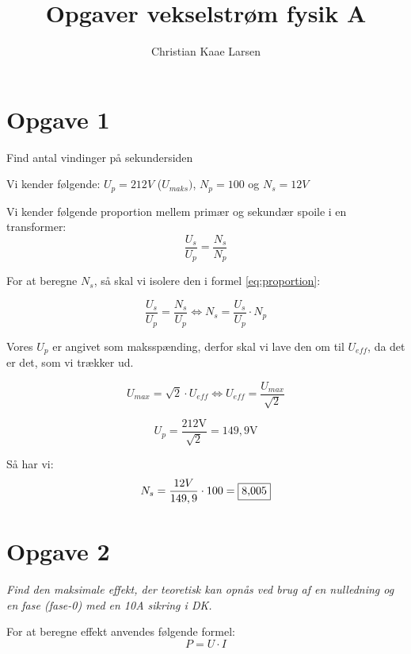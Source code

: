 \documentclass[a4paper, 12pt]{article}
\title{Opgaver vekselstrøm fysik A}
\author{Christian Kaae Larsen}
\begin{document}
\maketitle

\section*{Opgave 1}
Find antal vindinger på sekundersiden

Vi kender følgende: \(U_{p}=212 V\) (\(U_{maks})\), \(N_{p}=100\) og \(N_{s}=12 V\)

Vi kender følgende proportion mellem primær og sekundær spoile i en transformer:
\begin{equation*}
	\frac{U_{s}}{U_{p}}=\frac{N_{s}}{N_{p}}
	\label{eq:proportion}
\end{equation*}

For at beregne \(N_{s}\), så skal vi isolere den i formel \eqref{eq:proportion}:

\begin{equation*}
	\frac{U_{s}}{U_{p}}=\frac{N_{s}}{U_{p}} \Leftrightarrow N_{s} = \frac{U_{s}}{U_{p}} \cdot N_{p}
\end{equation*}

Vores \(U_{p}\) er angivet som maksspænding, derfor skal vi lave den om til \(U_{eff}\), da det er det, som vi trækker ud.

\begin{equation*}
	U_{max}=\sqrt{2}\cdot U_{eff} \Leftrightarrow U_{eff}=\frac{U_{max}}{\sqrt{2}}
\end{equation*}

\begin{equation*}
	U_{p} = \frac{212 \si{\volt}}{\sqrt{2}}= 149,9 \si{\volt}
\end{equation*}

Så har vi:
\begin{equation*}
	N_{s}=\frac{12V}{149,9}\cdot 100 = \framebox{8,005}
\end{equation*}

\section*{Opgave 2}
\textit{Find den maksimale effekt, der teoretisk kan opnås ved brug af en nulledning og en fase (fase-0) med en 10A sikring i DK.} \newline

For at beregne effekt anvendes følgende formel:
\begin{equation*}
	P=U \cdot I
\end{equation*}
\end{document}
